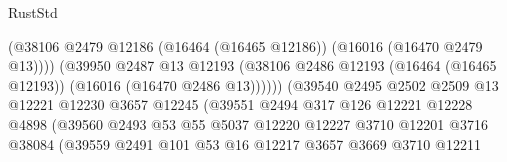 \begin{lexlean}{RustStd}
\begin{coremodule}
                                            (@38106
                                              @2479
                                              @12186
                                              (@16464 (@16465 @12186))
                                              (@16016 (@16470 @2479 @13))))
                                          (@39950
                                            @2487
                                            @13
                                            @12193
                                            (@38106
                                              @2486
                                              @12193
                                              (@16464 (@16465 @12193))
                                              (@16016 (@16470 @2486 @13))))))
                                      (@39540
                                        @2495
                                        @2502
                                        @2509
                                        @13
                                        @12221
                                        @12230
                                        @3657
                                        @12245
                                        (@39551
                                          @2494
                                          @317
                                          @126
                                          @12221
                                          @12228
                                          @4898
                                          (@39560
                                            @2493
                                            @53
                                            @55
                                            @5037
                                            @12220
                                            @12227
                                            @3710
                                            @12201
                                            @3716
                                            @38084
                                            (@39559
                                              @2491
                                              @101
                                              @53
                                              @16
                                              @12217
                                              @3657
                                              @3669
                                              @3710
                                              @12211

\end{coremodule}
\end{lexlean}
